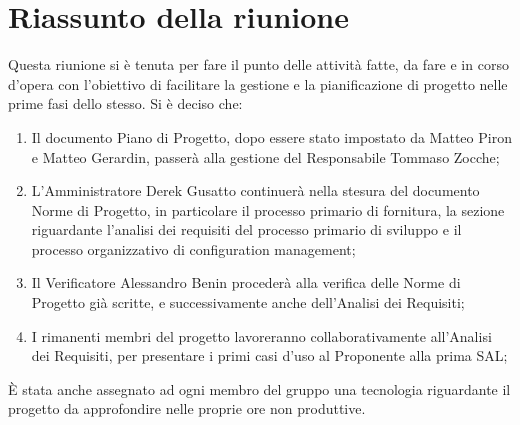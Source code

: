 \section{Riassunto della riunione}
Questa riunione si è tenuta per fare il punto delle attività fatte, da fare e in corso d'opera con l'obiettivo di facilitare la gestione e la pianificazione di progetto nelle prime fasi dello stesso.
Si è deciso che:
\begin{enumerate}
    \item Il documento Piano di Progetto, dopo essere stato impostato da Matteo Piron e Matteo Gerardin, passerà alla gestione del Responsabile Tommaso Zocche;
    \item L'Amministratore Derek Gusatto continuerà nella stesura del documento Norme di Progetto, in particolare il processo primario di fornitura, la sezione riguardante l'analisi dei requisiti del processo primario di sviluppo e il processo organizzativo di configuration management;
    \item Il Verificatore Alessandro Benin procederà alla verifica delle Norme di Progetto già scritte, e successivamente anche dell'Analisi dei Requisiti;
    \item I rimanenti membri del progetto lavoreranno collaborativamente all'Analisi dei Requisiti, per presentare i primi casi d'uso al Proponente alla prima SAL;
\end{enumerate}

È stata anche assegnato ad ogni membro del gruppo una tecnologia riguardante il progetto da approfondire nelle proprie ore non produttive.
 